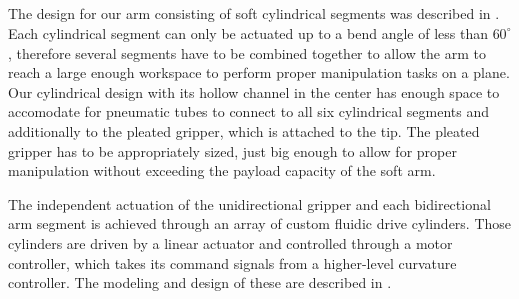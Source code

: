 \subsection{}

The design for our arm consisting of soft cylindrical segments was described in \cite{marchese2014whole}.
Each cylindrical segment can only be actuated up to a bend angle of less than $60^\circ$, therefore several segments have to be combined together to allow the arm to reach a large enough workspace to perform proper manipulation tasks on a plane. 
Our cylindrical design with its hollow channel in the center has enough space to accomodate for pneumatic tubes to connect to all six cylindrical segments and additionally to the pleated gripper, which is attached to the tip. 
The pleated gripper has to be appropriately sized, just big enough to allow for proper manipulation without exceeding the payload capacity of the soft arm.

The independent actuation of the unidirectional gripper and each bidirectional arm segment is achieved through an array of custom fluidic drive cylinders.
Those cylinders are driven by a linear actuator and controlled through a motor controller, which takes its command signals from a higher-level curvature controller. 
The modeling and design of these are described in \cite{marchese2014design}.

